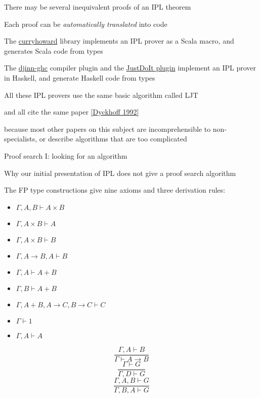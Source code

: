 There may be several inequivalent proofs of an IPL theorem

Each proof can be \emph{automatically translated} into code

The \href{https://github.com/Chymyst/curryhoward}{curryhoward} library
implements an IPL prover as a Scala macro, and generates Scala code
from types

The \href{https://hackage.haskell.org/package/djinn-ghc}{djinn-ghc}
compiler plugin and the \href{https://github.com/nomeata/ghc-justdoit}{JustDoIt plugin}
implement an IPL prover in Haskell, and generate Haskell code from
types

All these IPL provers use the same basic algorithm called LJT 

and all cite the same paper {\footnotesize{}\href{https://rd.host.cs.st-andrews.ac.uk/publications/jsl57.pdf}{[Dyckhoff 1992]}}{\footnotesize\par}

because most other papers on this subject are incomprehensible to
non-specialists, or describe algorithms that are too complicated

Proof search I: looking for an algorithm

Why our initial presentation of IPL does not give a proof search algorithm

The FP type constructions give nine axioms and three derivation rules:

\begin{minipage}[t]{0.49\columnwidth}%
\begin{itemize}
\item $\Gamma,A,B\vdash A\times B$ 
\item $\Gamma,A\times B\vdash A$ 
\item $\Gamma,A\times B\vdash B$
\item $\Gamma,A\rightarrow B,A\vdash B$
\item $\Gamma,A\vdash A+B$ 
\item $\Gamma,B\vdash A+B$
\item $\Gamma,A+B,A\rightarrow C,B\rightarrow C\vdash C$
\item $\Gamma\vdash1$
\item $\Gamma,A\vdash A$
\end{itemize}
%
\end{minipage}%
\begin{minipage}[t]{0.49\columnwidth}%
\[
\frac{\Gamma,A\vdash B}{\Gamma\vdash A\rightarrow B}
\]
\[
\frac{\Gamma\vdash G}{\Gamma,D\vdash G}
\]
\[
\frac{\Gamma,A,B\vdash G}{\Gamma,B,A\vdash G}
\]
%
\end{minipage}

